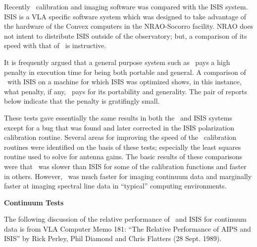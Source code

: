 
   Recently \AIPS\  calibration and imaging software was compared with
the ISIS system.  ISIS is a VLA specific software system which was
designed to take advantage of the hardware of the Convex computers in
the NRAO-Socorro facility.  NRAO does not intent to distribute ISIS
outside of the observatory; but, a comparison of its speed with that
of \AIPS\  is instructive.

   It is frequently argued that a general purpose system such as \AIPS\
pays a high penalty in execution time for being both portable and
general.  A comparison of \AIPS\  with ISIS on a machine for which ISIS
was optimized shows, in this instance, what penalty, if any, \AIPS\
pays for its portability and generality.  The pair of reports below
indicate that the penalty is gratifingly small.

   These tests gave essentially the same results in both the
\AIPS\ and ISIS systems except for a bug that was found and later
corrected in the ISIS polarization calibration routine.  Several areas
for improving the speed of the \AIPS\ calibration routines were
identified on the basis of these tests; especially the least squares
routine used to solve for antenna gains.  The basic results of these
comparisons were that \AIPS\ was slower than ISIS for some of the
calibration functions and faster in others.  However, \AIPS\ was much
faster for imaging continuum data and marginally faster at imaging
spectral line data in ``typical'' computing environments.
\medskip
\centerline{\bf{Continuum Tests}}

   The following discussion of the relative performance of \AIPS\ and
ISIS for continuum data is from VLA Computer Memo 181: ``The Relative
Performance of AIPS and ISIS'' by Rick Perley, Phil Diamond and Chris
Flatters (28 Sept. 1989).

